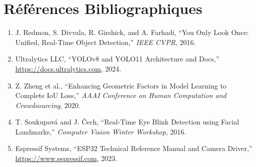 \documentclass[11pt,a4paper]{article}
\begin{document}
\section{Références Bibliographiques}
\begin{enumerate}
    \item J. Redmon, S. Divvala, R. Girshick, and A. Farhadi, ``You Only Look Once: Unified, Real-Time Object Detection,'' \emph{IEEE CVPR}, 2016.
    \item Ultralytics LLC, ``YOLOv8 and YOLO11 Architecture and Docs,'' \url{https://docs.ultralytics.com}, 2024.
    \item Z. Zheng et al., ``Enhancing Geometric Factors in Model Learning to Complete IoU Loss,'' \emph{AAAI Conference on Human Computation and Crowdsourcing}, 2020.
    \item T. Soukupová and J. Čech, ``Real-Time Eye Blink Detection using Facial Landmarks,'' \emph{Computer Vision Winter Workshop}, 2016.
    \item Espressif Systems, ``ESP32 Technical Reference Manual and Camera Driver,'' \url{https://www.espressif.com}, 2023.
\end{enumerate}
\end{document}
